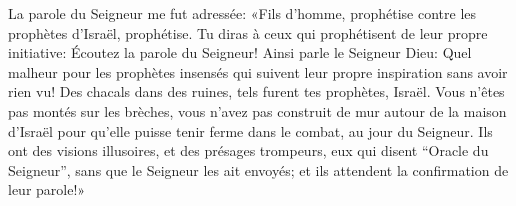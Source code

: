 La parole du Seigneur me fut adressée:
	«Fils d’homme, prophétise contre les prophètes d’Israël, prophétise.
Tu diras à ceux qui prophétisent de leur propre initiative:
	Écoutez la parole du Seigneur!
Ainsi parle le Seigneur Dieu:
	Quel malheur pour les prophètes insensés
		qui suivent leur propre inspiration sans avoir rien vu!
Des chacals dans des ruines, tels furent tes prophètes, Israël.
Vous n’êtes pas montés sur les brèches,
	vous n’avez pas construit de mur autour de la maison d’Israël
	pour qu’elle puisse tenir ferme dans le combat, au jour du Seigneur.
Ils ont des visions illusoires, et des présages trompeurs,
	eux qui disent “Oracle du Seigneur”, sans que le Seigneur les ait envoyés;
	et ils attendent la confirmation de leur parole!»
